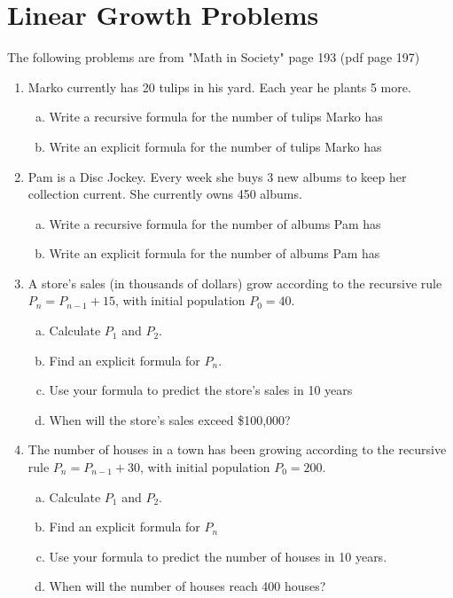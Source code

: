 \documentclass{article}
\begin{document}
\section{Linear Growth Problems}
The following problems are from "Math in Society" page 193 (pdf page 197)
\begin{enumerate}[resume]
\item Marko currently has 20 tulips in his yard. Each year he plants 5 more.
    \begin{enumerate}[a.)]
    \item Write a recursive formula for the number of tulips Marko has
    \item Write an explicit formula for the number of tulips Marko has
    \end{enumerate}
\item Pam is a Disc Jockey. Every week she buys 3 new albums to keep her collection current. She currently owns 450 albums.
    \begin{enumerate}[a.)]
    \item Write a recursive formula for the number of albums Pam has
    \item Write an explicit formula for the number of albums Pam has
    \end{enumerate}
\item A store's sales (in thousands of dollars) grow according to the recursive rule $P_n=P_{n-1} + 15$, with initial population $P_0=40$.
    \begin{enumerate}[a.)]
    \item Calculate $P_1$ and $P_2$.
    \item Find an explicit formula for $P_n$.
    \item Use your formula to predict the store’s sales in 10 years
    \item When will the store’s sales exceed \$100,000?
    \end{enumerate}
\item The number of houses in a town has been growing according to the recursive rule $P_n=P_{n-1} + 30$, with initial population $P_0=200$.
    \begin{enumerate}[a.)]
    \item Calculate $P_1$ and $P_2$.
    \item Find an explicit formula for $P_n$
    \item Use your formula to predict the number of houses in 10 years.
    \item When will the number of houses reach 400 houses?

\end{enumerate}
\end{enumerate}
\end{document}
